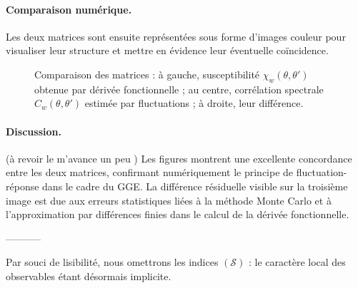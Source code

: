 \paragraph{Comparaison numérique.}
%

Les deux matrices sont ensuite représentées sous forme d'images couleur pour visualiser leur structure et mettre en évidence leur éventuelle coïncidence.

\begin{figure}[H]
    \centering
    \caption{Comparaison des matrices : à gauche, susceptibilité \( \chi_w(\theta,\theta') \) obtenue par dérivée fonctionnelle ; au centre, corrélation spectrale \( C_w(\theta,\theta') \) estimée par fluctuations ; à droite, leur différence.}
    \label{fig:comparison_chi_C}
\end{figure}

\paragraph{Discussion.}

{\color{blue} { (\color{red}à revoir le m'avance un peu )} Les figures montrent une excellente concordance entre les deux matrices, confirmant numériquement le principe de fluctuation-réponse dans le cadre du GGE. La différence résiduelle visible sur la troisième image est due aux erreurs statistiques liées à la méthode Monte Carlo et à l’approximation par différences finies dans le calcul de la dérivée fonctionnelle.} 

-----------

Par souci de lisibilité, nous omettrons les indices \((\mathcal{S})\) : le caractère local des observables étant désormais implicite.\\

